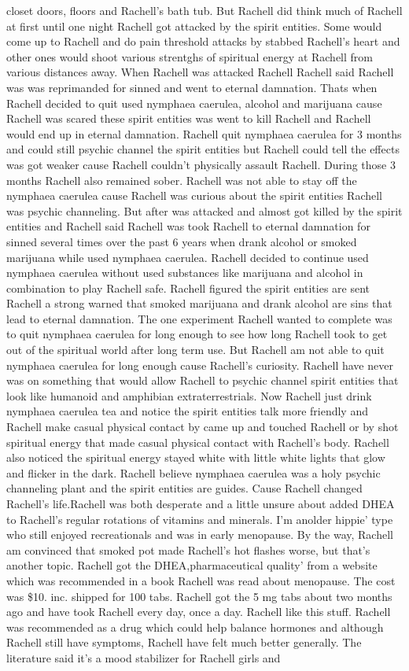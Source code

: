\documentclass[12pt]{book}
\begin{document}
closet doors, floors and Rachell's bath tub. But Rachell did think much of Rachell at first until one night Rachell got attacked by the spirit entities. Some would come up to Rachell and do pain threshold attacks by stabbed Rachell's heart and other ones would shoot various strentghs of spiritual energy at Rachell from various distances away. When Rachell was attacked Rachell Rachell said Rachell was was reprimanded for sinned and went to eternal damnation. Thats when Rachell decided to quit used nymphaea caerulea, alcohol and marijuana cause Rachell was scared these spirit entities was went to kill Rachell and Rachell would end up in eternal damnation. Rachell quit nymphaea caerulea for 3 months and could still psychic channel the spirit entities but Rachell could tell the effects was got weaker cause Rachell couldn't physically assault Rachell. During those 3 months Rachell also remained sober. Rachell was not able to stay off the nymphaea caerulea cause Rachell was curious about the spirit entities Rachell was psychic channeling. But after was attacked and almost got killed by the spirit entities and Rachell said Rachell was took Rachell to eternal damnation for sinned several times over the past 6 years when drank alcohol or smoked marijuana while used nymphaea caerulea. Rachell decided to continue used nymphaea caerulea without used substances like marijuana and alcohol in combination to play Rachell safe. Rachell figured the spirit entities are sent Rachell a strong warned that smoked marijuana and drank alcohol are sins that lead to eternal damnation. The one experiment Rachell wanted to complete was to quit nymphaea caerulea for long enough to see how long Rachell took to get out of the spiritual world after long term use. But Rachell am not able to quit nymphaea caerulea for long enough cause Rachell's curiosity. Rachell have never was on something that would allow Rachell to psychic channel spirit entities that look like humanoid and amphibian extraterrestrials. Now Rachell just drink nymphaea caerulea tea and notice the spirit entities talk more friendly and Rachell make casual physical contact by came up and touched Rachell or by shot spiritual energy that made casual physical contact with Rachell's body. Rachell also noticed the spiritual energy stayed white with little white lights that glow and flicker in the dark. Rachell believe nymphaea caerulea was a holy psychic channeling plant and the spirit entities are guides. Cause Rachell changed Rachell's life.Rachell was both desperate and a little unsure about added DHEA to Rachell's regular rotations of vitamins and minerals. I'm anolder hippie' type who still enjoyed recreationals and was in early menopause. By the way, Rachell am convinced that smoked pot made Rachell's hot flashes worse, but that's another topic. Rachell got the DHEA,pharmaceutical quality' from a website which was recommended in a book Rachell was read about menopause. The cost was \$10. inc. shipped for 100 tabs. Rachell got the 5 mg tabs about two months ago and have took Rachell every day, once a day. Rachell like this stuff. Rachell was recommended as a drug which could help balance hormones and although Rachell still have symptoms, Rachell have felt much better generally. The literature said it's a mood stabilizer for Rachell girls and 
\end{document}
